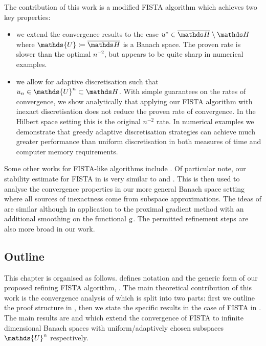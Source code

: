 \documentclass[10pt,a4paper,onecolumn]{article}
\numberwithin{equation}{section}
\let\F\mathds\let\C\mathcal\newcommand{\R}{\F{R}}\newcommand{\A}{\C{A}}
\newcommand{\op}[1]{\operatorname{#1}}\newcommand{\overtext}[2]{\stackrel{\text{#1}}{#2}}
\renewcommand{\bar}{\overline}\renewcommand{\hat}{\widehat}\renewcommand{\tilde}{\widetilde}
\newcommand*{\func}[1]{%
	\IfEqCase{#1}{%
		{0}{\op{e}}%
		{1}{\op{f}}%
		{2}{\op{g}}%
		{3}{\op{h}}%
	}[\op{f}#1]%
}
\newcommand*{\varf}[1]{%
	\IfEqCase{#1}{%
		{0}{u}%
		{1}{v}%
		{2}{w}%
	}[u#1]%
}
\newcommand*{\spcf}[1]{%
	\IfEqCase{#1}{%
		{0}{\F{U}}%
		{1}{\F{V}}%
		{2}{\F{W}}%
	}[\F{U}#1]%
}
\begin{document}
The contribution of this work is a modified FISTA algorithm which achieves two key properties:
\begin{itemize}
	\item we extend the convergence results to the case $\varf0^*\in\bar{\F H}\setminus\F H$ where $\spcf0\coloneqq \bar{\F H}$ is a Banach space. The proven rate is slower than the optimal $n^{-2}$, but appears to be quite sharp in numerical examples.
	\item we allow for adaptive discretisation such that $\varf0_n\in\spcf0^n\subset\F H$. With simple guarantees on the rates of convergence, we show analytically that applying our FISTA algorithm with inexact discretisation does not reduce the proven rate of convergence. In the Hilbert space setting this is the original $n^{-2}$ rate. In numerical examples we demonstrate that greedy adaptive discretisation strategies can achieve much greater performance than uniform discretisation in both measures of time and computer memory requirements.
\end{itemize}
 Some other works for FISTA-like algorithms include \citep{Jiang2012,Villa2013}. Of particular note, our stability estimate for FISTA  in  is very similar to \cite[Proposition 2]{Schmidt2011} and \cite[Proposition 3.3]{Aujol2015}. This is then used to analyse the convergence properties in our more general Banach space setting where all sources of inexactness come from subspace approximations. The ideas of \citet{Parpas2017} are similar although in application to the proximal gradient method with an additional smoothing on the functional $\func2$. The permitted refinement steps are also more broad in our work.


\subsection{Outline}
This chapter is organised as follows.  defines notation and the generic form of our proposed refining FISTA algorithm, . The main theoretical contribution of this work is the convergence analysis of  which is split into two parts: first we outline the proof structure in , then we state the specific results in the case of FISTA in . The main results are  and  which extend the convergence of FISTA to infinite dimensional Banach spaces with uniform/adaptively chosen subspaces $\spcf0^n$ respectively.
\end{document}

